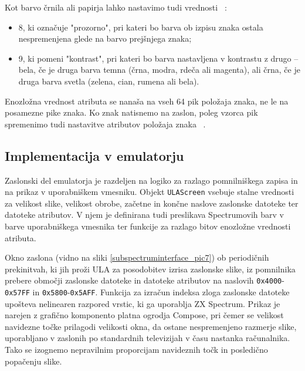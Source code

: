 \documentclass[a4paper, 12pt, openright]{book}
\begin{document}
    Kot barvo črnila ali papirja lahko nastavimo tudi vrednosti ~\cite{zxspectrumbasicprogramming}:
    \begin{itemize}
        \item 8, ki označuje "prozorno", pri kateri bo barva ob izpisu znaka ostala
            nespremenjena glede na barvo prejšnjega znaka;

        \item 9, ki pomeni "kontrast", pri kateri bo barva nastavljena v kontrastu
            z drugo -- bela, če je druga barva temna (črna, modra, rdeča ali
            magenta), ali črna, če je druga barva svetla (zelena, cian, rumena
            ali bela).
    \end{itemize}

    Enozložna vrednost atributa se nanaša na vseh 64 pik položaja znaka, ne le
    na posamezne pike znaka. Ko znak natisnemo na zaslon, poleg vzorca pik
    spremenimo tudi nastavitve atributov položaja znaka ~\cite{zxspectrumbasicprogramming}.

    \subsection{Implementacija v emulatorju}

    Zaslonski del emulatorja je razdeljen na logiko za razlago pomnilniškega
    zapisa in na prikaz v uporabniškem vmesniku. Objekt \texttt{ULAScreen}
    vsebuje stalne vrednosti za velikost slike, velikost obrobe, začetne in
    končne naslove zaslonske datoteke ter datoteke atributov. V njem je definirana
    tudi preslikava Spectrumovih barv v barve uporabniškega vmesnika ter funkcije
    za razlago bitov enozložne vrednosti atributa.

    Okno zaslona (vidno na sliki \ref{subspectruminterface_pic7}) ob periodičnih prekinitvah,
    ki jih proži ULA za posodobitev izrisa zaslonske slike, iz pomnilnika prebere
    območji zaslonske datoteke in datoteke atributov na naslovih \texttt{0x4000}-\texttt{0x57FF}
    in \texttt{0x5800}-\texttt{0x5AFF}. Funkcija za izračun indeksa zloga
    zaslonske datoteke upošteva nelinearen razpored vrstic, ki ga uporablja ZX Spectrum.
    Prikaz je narejen z grafično komponento platna ogrodja Compose, pri čemer se velikost
    navidezne točke prilagodi velikosti okna, da ostane nespremenjeno razmerje
    slike, uporabljano v zaslonih po standardnih televizijah v času nastanka računalnika.
    Tako se izognemo nepravilnim proporcijam navideznih točk in posledično
    popačenju slike.
\end{document}
